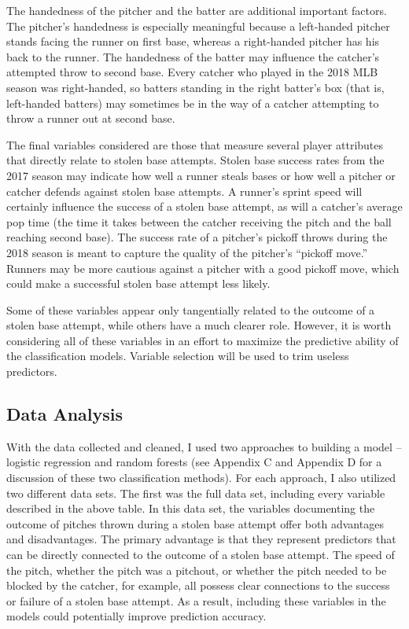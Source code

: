\documentclass{article}
\begin{document}
The handedness of the pitcher and the batter are additional important factors. The pitcher’s handedness is especially meaningful because a left-handed pitcher stands facing the runner on first base, whereas a right-handed pitcher has his back to the runner. The handedness of the batter may influence the catcher’s attempted throw to second base. Every catcher who played in the 2018 MLB season was right-handed, so batters standing in the right batter’s box (that is, left-handed batters) may sometimes be in the way of a catcher attempting to throw a runner out at second base.

The final variables considered are those that measure several player attributes that directly relate to stolen base attempts. Stolen base success rates from the 2017 season may indicate how well a runner steals bases or how well a pitcher or catcher defends against stolen base attempts. A runner’s sprint speed will certainly influence the success of a stolen base attempt, as will a catcher’s average pop time (the time it takes between the catcher receiving the pitch and the ball reaching second base). The success rate of a pitcher’s pickoff throws during the 2018 season is meant to capture the quality of the pitcher’s “pickoff move.” Runners may be more cautious against a pitcher with a good pickoff move, which could make a successful stolen base attempt less likely.

Some of these variables appear only tangentially related to the outcome of a stolen base attempt, while others have a much clearer role. However, it is worth considering all of these variables in an effort to maximize the predictive ability of the classification models. Variable selection will be used to trim useless predictors.


\subsection{Data Analysis}
With the data collected and cleaned, I used two approaches to building a model – logistic regression and random forests (see Appendix C and Appendix D for a discussion of these two classification methods). For each approach, I also utilized two different data sets. The first was the full data set, including every variable described in the above table. In this data set, the variables documenting the outcome of pitches thrown during a stolen base attempt offer both advantages and disadvantages. The primary advantage is that they represent predictors that can be directly connected to the outcome of a stolen base attempt. The speed of the pitch, whether the pitch was a pitchout, or whether the pitch needed to be blocked by the catcher, for example, all possess clear connections to the success or failure of a stolen base attempt. As a result, including these variables in the models could potentially improve prediction accuracy.
\end{document}
